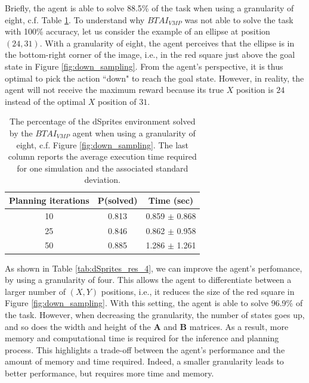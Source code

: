 \documentclass[twoside,11pt]{article}
\begin{document}
Briefly, the agent is able to solve 88.5\% of the task when using a granularity of eight, c.f. Table \ref{tab:dSprites_res_8}. To understand why $BTAI_{VMP}$ was not able to solve the task with 100\% accuracy, let us consider the example of an ellipse at position $(24,31)$. With a granularity of eight, the agent perceives that the ellipse is in the bottom-right corner of the image, i.e., in the red square just above the goal state in Figure \ref{fig:down_sampling}. From the agent's perspective, it is thus optimal to pick the action ``down" to reach the goal state. However, in reality, the agent will not receive the maximum reward because its true $X$ position is $24$ instead of the optimal $X$ position of $31$. 

\begin{table}[H]
\centering
\begin{tabular}{ |c|c|c| }
 \hline
 Planning iterations & P(solved) & Time (sec) \\
 \hline
 10 & 0.813	 & 0.859 $\pm$ 0.868 \\
 \hline
 25 & 0.846 & 0.862 $\pm$ 0.958 \\
 \hline
 50 & 0.885 & 1.286 $\pm$ 1.261 \\
 \hline
\end{tabular}
\caption{The percentage of the dSprites environment solved by the $BTAI_{VMP}$ agent when using a granularity of eight, c.f. Figure \ref{fig:down_sampling}. The last column reports the average execution time required for one simulation and the associated standard deviation.}
\label{tab:dSprites_res_8}
\end{table}

As shown in Table \ref{tab:dSprites_res_4}, we can improve the agent's perfomance, by using a granularity of four. This allows the agent to differentiate between a larger number of $(X,Y)$ positions, i.e., it reduces the size of the red square in Figure \ref{fig:down_sampling}. With this setting, the agent is able to solve 96.9\% of the task. However, when decreasing the granularity, the number of states goes up, and so does the width and height of the $\bm{A}$ and $\bm{B}$ matrices. As a result, more memory and computational time is required for the inference and planning process. This highlights a trade-off between the agent's performance and the amount of memory and time required. Indeed, a smaller granularity leads to better performance, but requires more time and memory.
\end{document}
